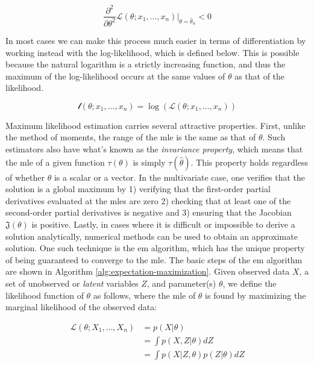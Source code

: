 \documentclass{report}
\begin{document}
\begin{equation}\label{eq:likelihood-function-global-max-check}
    \frac{\partial^2}{\partial\theta^2} \mathcal{L}(\theta; x_1, \dots, x_n)|_{\theta = \hat{\theta}_n} < 0 
\end{equation}

In most cases we can make this process much easier in terms of differentiation by working instead with the log-likelihood, which is defined below. This is possible because the natural logarithm is a strictly increasing function, and thus the maximum of the log-likelihood occurs at the same values of $\theta$ as that of the likelihood. 

\begin{equation}\label{eq:log-likelihood}
    \mathcal{l}(\theta; x_1, \dots, x_n) = \log\left(\mathcal{L}(\theta; x_1, \dots, x_n)\right)
\end{equation}

Maximum likelihood estimation carries several attractive properties. First, unlike the method of moments, the range of the \gls{mle} is the same as that of $\theta$. Such estimators also have what's known as the \textit{invariance property}, which means that the \gls{mle} of a given function $\tau(\theta)$ is simply $\tau\left(\hat{\theta}\right)$. This property holds regardless of whether $\theta$ is a scalar or a vector. In the multivariate case, one verifies that the solution is a global maximum by 1) verifying that the first-order partial derivatives evaluated at the \glspl{mle} are zero 2) checking that at least one of the second-order partial derivatives is negative and 3) ensuring that the Jacobian $\mathfrak{J}(\theta)$ is positive. Lastly, in cases where it is difficult or impossible to derive a solution analytically, numerical methods can be used to obtain an approximate solution. One such technique is the \gls{em} algorithm, which has the unique property of being guaranteed to converge to the \gls{mle}. The basic steps of the \gls{em} algorithm are shown in Algorithm \ref{alg:expectation-maximization}. Given observed data $X$, a set of unobserved or \textit{latent} variables $Z$, and parameter(s) $\theta$, we define the likelihood function of $\theta$ as follows, where the \gls{mle} of $\theta$ is found by maximizing the marginal likelihood of the observed data:

\begin{equation}\label{eq:expectation-maximization-likelihood}
    \begin{aligned}
        \mathcal{L}(\theta;  X_1, \dots, X_n) 
          &= p(X | \theta) \\
          &= \int p(X, Z | \theta) dZ \\
          &= \int p(X | Z, \theta) p(Z|\theta) dZ 
    \end{aligned}
\end{equation}
\end{document}
